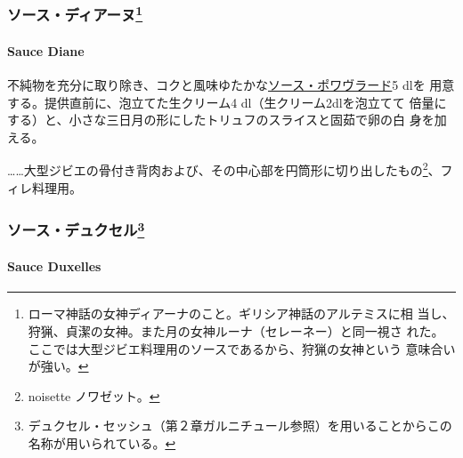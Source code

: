 \maeaki

\hypertarget{ux30bdux30fcux30b9ux30c7ux30a3ux30a2ux30fcux30cc28}{%
\subsubsection[ソース・ディアーヌ]{\texorpdfstring{ソース・ディアーヌ\footnote{ローマ神話の女神ディアーナのこと。ギリシア神話のアルテミスに相
  当し、狩猟、貞潔の女神。また月の女神ルーナ（セレーネー）と同一視さ
  れた。ここでは大型ジビエ料理用のソースであるから、狩猟の女神という
  意味合いが強い。}}{ソース・ディアーヌ}}\label{ux30bdux30fcux30b9ux30c7ux30a3ux30a2ux30fcux30cc28}}

\hypertarget{sauce-diane}{%
\paragraph{Sauce Diane}\label{sauce-diane}}

 

不純物を充分に取り除き、コクと風味ゆたかな\protect\hyperlink{sauce-poivrade}{ソース・ポワヴラード}5
dlを 用意する。提供直前に、泡立てた生クリーム4
dl（生クリーム2dlを泡立てて
倍量にする）と、小さな三日月の形にしたトリュフのスライスと固茹で卵の白
身を加える。

\ldots{}\ldots{}大型ジビエの骨付き背肉および、その中心部を円筒形に切り出したもの\footnote{noisette
  ノワゼット。}、フィレ料理用。

\maeaki

\hypertarget{ux30bdux30fcux30b9ux30c7ux30e5ux30afux30bbux30eb29}{%
\subsubsection[ソース・デュクセル]{\texorpdfstring{ソース・デュクセル\footnote{デュクセル・セッシュ（第２章ガルニチュール参照）を用いることからこの名称が用いられている。}}{ソース・デュクセル}}\label{ux30bdux30fcux30b9ux30c7ux30e5ux30afux30bbux30eb29}}

\hypertarget{sauce-duxelles}{%
\paragraph{Sauce Duxelles}\label{sauce-duxelles}}


